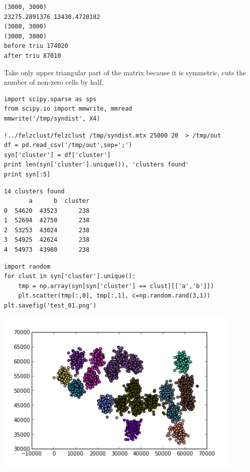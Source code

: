 \documentclass[12pt,fleqn]{article}\usepackage{common}
\begin{document}
\begin{verbatim}
(3000, 3000)
23275.2891376 13430.4720182
(3000, 3000)
(3000, 3000)
before triu 174020
after triu 87010
\end{verbatim}

Take only upper triangular part of the matrix because it is symmetric, cuts
the number of non-zero cells by half,

\begin{verbatim}
import scipy.sparse as sps
from scipy.io import mmwrite, mmread
mmwrite('/tmp/syndist', X4)
\end{verbatim}

\begin{verbatim}
!../felzclust/felzclust /tmp/syndist.mtx 25000 20  > /tmp/out
df = pd.read_csv('/tmp/out',sep=';')
syn['cluster'] = df['cluster']
print len(syn['cluster'].unique()), 'clusters found'
print syn[:5]
\end{verbatim}

\begin{verbatim}
14 clusters found
       a      b  cluster
0  54620  43523      238
1  52694  42750      238
2  53253  43024      238
3  54925  42624      238
4  54973  43980      238
\end{verbatim}

\begin{verbatim}
import random
for clust in syn['cluster'].unique():
    tmp = np.array(syn[syn['cluster'] == clust][['a','b']])
    plt.scatter(tmp[:,0], tmp[:,1], c=np.random.rand(3,1))
plt.savefig('test_01.png')
\end{verbatim}


\includegraphics[height=8cm]{test_01.png}
\end{document}
